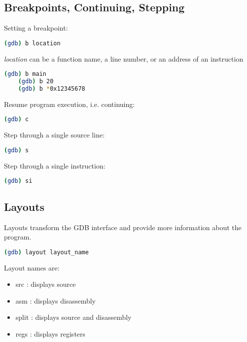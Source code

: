 \documentclass{article}
\begin{document}
	\subsection{Breakpoints, Continuing, Stepping}
    
    Setting a breakpoint:
    \begin{lstlisting}[language=bash]
    (gdb) b location
    \end{lstlisting}
    
    \textit{location} can be a function name, a line number, or an address of an instruction
    
    \begin{lstlisting}[language=bash]
    (gdb) b main
    (gdb) b 20
    (gdb) b *0x12345678
    \end{lstlisting}
    
    Resume program execution, i.e. continuing:
    \begin{lstlisting}[language=bash]
    (gdb) c
    \end{lstlisting}
    
    Step through a single source line:
    \begin{lstlisting}[language=bash]
    (gdb) s
    \end{lstlisting}
    
    Step through a single instruction:
    \begin{lstlisting}[language=bash]
    (gdb) si
    \end{lstlisting}
    
    \subsection{Layouts}
    
    Layouts transform the GDB interface and provide more information about the program.
    
    \begin{lstlisting}[language=bash]
    (gdb) layout layout_name
    \end{lstlisting}
    
    Layout names are:
    
    \vspace{-\topsep}
	\begin{itemize}
	\item src : displays source
	\item asm : displays disassembly
	\item split : displays source and disassembly
	\item regs : displays registers
	\end{itemize}
	
\end{document}
